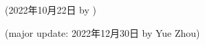 \begin{flushright}
(2022年10月22日 by \Wu)

(major update: 2022年12月30日 by Yue Zhou)
\end{flushright}





% 
